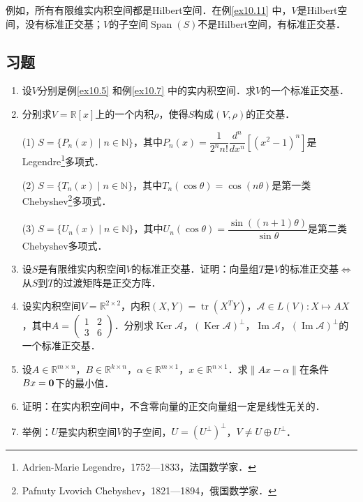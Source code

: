 \documentclass[a4paper,fontset=windows]{ctexbook}
\theoremstyle{definition}
\DeclareMathOperator{\im}{Im}
\DeclareMathOperator{\Ker}{Ker}
\DeclareMathOperator{\Span}{Span}
\DeclareMathOperator{\tr}{tr}
\begin{document}
例如，所有有限维实内积空间都是Hilbert空间．在例\ref{ex10.11} 中，$V$是Hilbert空间，没有标准正交基；$V$的子空间$\Span(S)$不是Hilbert空间，有标准正交基．

\subsection*{习题}

\begin{enumerate}
\item 设$V$分别是例\ref{ex10.5} 和例\ref{ex10.7} 中的实内积空间．求$V$的一个标准正交基．

\item 分别求$V=\mathbb{R}[x]$上的一个内积$\rho$，使得$S$构成$(V,\rho)$的正交基．

(1) $S=\{P_n(x)\mid n\in\mathbb{N}\}$，其中$P_n(x)=\dfrac{1}{2^nn!}\dfrac{d^n}{dx^n}[(x^2-1)^n]$是Legendre\footnote{Adrien-Marie Legendre，1752—1833，法国数学家．}多项式．

(2) $S=\{T_n(x)\mid n\in\mathbb{N}\}$，其中$T_n(\cos\theta)=\cos(n\theta)$是第一类Chebyshev\footnote{Pafnuty Lvovich Chebyshev，1821—1894，俄国数学家．}多项式．

(3) $S=\{U_n(x)\mid n\in\mathbb{N}\}$，其中$U_n(\cos\theta)=\dfrac{\sin((n+1)\theta)}{\sin\theta}$是第二类Chebyshev多项式．

\item 设$S$是有限维实内积空间$V$的标准正交基．证明：向量组$T$是$V$的标准正交基$\Leftrightarrow$从$S$到$T$的过渡矩阵是正交方阵．

\item 设实内积空间$V=\mathbb{R}^{2\times 2}$，内积$(X,Y)=\tr(X^TY)$，$\mathcal{A}\in L(V):X\mapsto AX$，其中$A=\begin{pmatrix}1&2 \\ 3&6\end{pmatrix}$．分别求$\Ker\mathcal{A}$，$(\Ker\mathcal{A})^\perp$，$\im\mathcal{A}$，$(\im\mathcal{A})^\perp$的一个标准正交基．

\item 设$A\in\mathbb{R}^{m\times n}$，$B\in\mathbb{R}^{k\times n}$，$\alpha\in\mathbb{R}^{m\times 1}$，$x\in\mathbb{R}^{n\times 1}$．求$\|Ax-\alpha\|$在条件$Bx={\bf 0}$下的最小值．

\item 证明：在实内积空间中，不含零向量的正交向量组一定是线性无关的．

\item 举例：$U$是实内积空间$V$的子空间，$U=(U^\perp)^\perp$，$V\ne U\oplus U^\perp$．


\end{enumerate}
\end{document}
